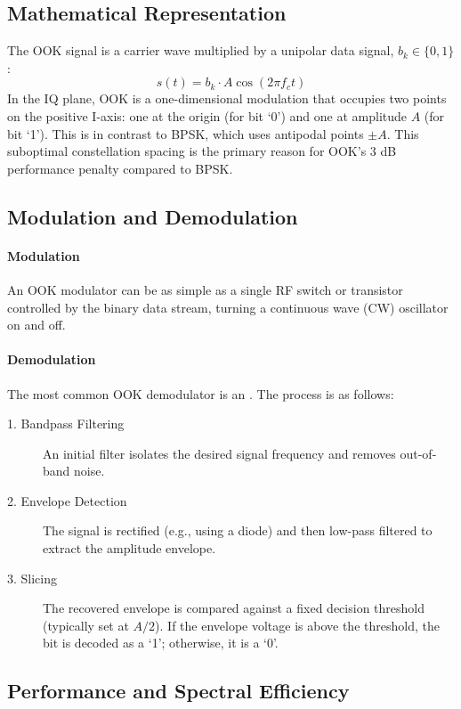 \subsection{Mathematical Representation}

The OOK signal is a carrier wave multiplied by a unipolar data signal, $b_k \in \{0, 1\}$:
\begin{equation}
    s(t) = b_k \cdot A \cos(2\pi f_c t)
\end{equation}
In the IQ plane, OOK is a one-dimensional modulation that occupies two points on the positive I-axis: one at the origin (for bit `0') and one at amplitude $A$ (for bit `1'). This is in contrast to BPSK, which uses antipodal points $\pm A$. This suboptimal constellation spacing is the primary reason for OOK's 3 dB performance penalty compared to BPSK.


\subsection{Modulation and Demodulation}

\paragraph{Modulation}
An OOK modulator can be as simple as a single RF switch or transistor controlled by the binary data stream, turning a continuous wave (CW) oscillator on and off.

\paragraph{Demodulation}
The most common OOK demodulator is an . The process is as follows:
\begin{description}
    \item[1. Bandpass Filtering] An initial filter isolates the desired signal frequency and removes out-of-band noise.
    \item[2. Envelope Detection] The signal is rectified (e.g., using a diode) and then low-pass filtered to extract the amplitude envelope.
    \item[3. Slicing] The recovered envelope is compared against a fixed decision threshold (typically set at $A/2$). If the envelope voltage is above the threshold, the bit is decoded as a `1'; otherwise, it is a `0'.
\end{description}


\subsection{Performance and Spectral Efficiency}

